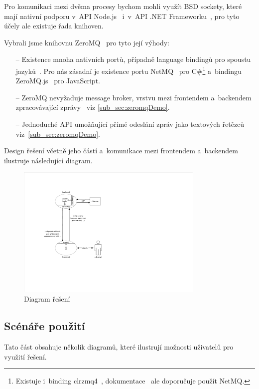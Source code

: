 \documentclass[12pt, a4paper, twoside]{article}
\begin{document}
	Pro komunikaci mezi dvěma procesy bychom mohli využít BSD sockety, které mají nativní podporu v~API Node.js~\cite{nodejsApi} i~v~API .NET Frameworku~\cite{dotnetApi}, pro tyto účely ale existuje řada knihoven. 
	
	Vybrali jsme knihovnu ZeroMQ~\cite{zeromq} pro tyto její výhody:
	\begin{itemize}
		\item[--] Existence mnoha nativních portů, případně language bindingů pro spoustu jazyků~\cite{zeromqDocs}. Pro nás zásadní je existence portu NetMQ~\cite{netmqGithub} pro C\#\footnote{Existuje i~binding clrzmq4~\cite{crlzmq4}, dokumentace~\cite{zeromqCSharp} ale doporučuje použít NetMQ.} a~bindingu ZeroMQ.js~\cite{zeromqJs} pro JavaScript.
		\item[--] ZeroMQ nevyžaduje message broker, vrstvu mezi frontendem a~backendem zpracovávající zprávy~\cite{messageBroker} viz \ref{sub_sec:zeromqDemo}.
		\item[--] Jednoduché API umožňující přímé odeslání zpráv jako textových řetězců viz~\ref{sub_sec:zeromqDemo}.
	\end{itemize}
	Design řešení včetně jeho částí a~komunikace mezi frontendem a~backendem ilustruje následující diagram.
	\nopagebreak
	\begin{figure}[H]
		\centering
		\includegraphics[width=0.8\textwidth]{design.pdf}
		\caption{Diagram řešení}
	\end{figure}
	\newpage
	\subsection{Scénáře použití}
	Tato část obsahuje několik diagramů, které ilustrují možnosti uživatelů pro využití řešení.
\end{document}
